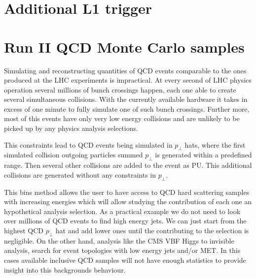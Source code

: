 \section{Additional L1 trigger}

% 
% 
% 
% 

\section{Run II QCD Monte Carlo samples}
\label{SECTION:RunIIPreparation_RunIIQCDMonteCarloSamples}


Simulating and reconstructing quantities of \gls{QCD} events comparable to the ones produced at the \gls{LHC} experiments is impractical. At every second of \gls{LHC} physics operation several millions of bunch crossings happen, each one able to create several simultaneous collisions. With the currently available hardware it takes in excess of one minute to fully simulate one of such bunch crossings. Further more, most of this events have only very low energy collisions and are unlikely to be picked up by any physics analysis selections.  

This constraints lead to \gls{QCD} events being simulated in $p_\perp$ hats, where the first simulated collision outgoing particles summed $p_\perp$ is generated within a predefined range. Then several other collisions are added to the event as \gls{PU}. This additional collisions are generated without any constraints in $p_\perp$. 

This bins method allows the user to have access to \gls{QCD} hard scattering samples with increasing energies which will allow studying the contribution of each one an hypothetical analysis selection. As a practical example we do not need to look over millions of \gls{QCD} events to find high energy jets. We can just start from the highest \gls{QCD} $p_\perp$ hat and add lower ones until the contributing to the selection is negligible. On the other hand, analysis like the \gls{CMS} \gls{VBF} Higgs to invisible analysis, search for event topologies with low energy jets and/or \gls{MET}. In this cases available inclusive \gls{QCD} samples will not have enough statistics to provide insight into this backgrounds behaviour. 

